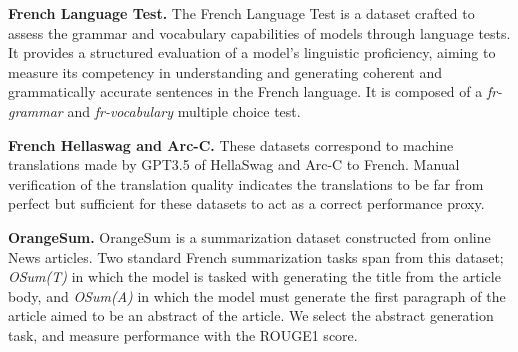 


\textbf{French Language Test.} The French Language Test is a dataset crafted to assess the grammar and vocabulary capabilities of models through language tests. It provides a structured evaluation of a model's linguistic proficiency, aiming to measure its competency in understanding and generating coherent and grammatically accurate sentences in the French language. It is composed of a \textit{fr-grammar} and \textit{fr-vocabulary} multiple choice test.

\textbf{French Hellaswag and Arc-C.} These datasets correspond to machine translations made by GPT3.5 of HellaSwag and Arc-C to French. Manual verification of the translation quality indicates the translations to be far from perfect but sufficient for these datasets to act as a correct performance proxy.

\textbf{OrangeSum.} OrangeSum  is a summarization dataset constructed from online News articles. Two standard French summarization tasks span from this dataset; \textit{OSum(T)} in which the model is tasked with generating the title from the article body, and \textit{OSum(A)} in which the model must generate the first paragraph of the article aimed to be an abstract of the article. We select the abstract generation task, and measure performance with the ROUGE1 score.


